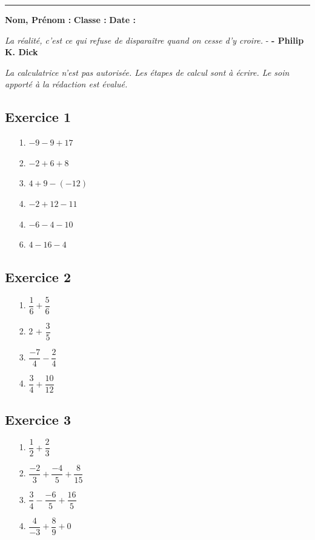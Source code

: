 \documentclass[12pt]{article}
\newcommand{\horrule}[1]{\rule{\linewidth}{#1}}
\begin{document}
\vspace{0.4cm}
\horrule{1px}
\vspace{0.4cm}

\textbf{Nom, Prénom :} \hspace{8cm} \textbf{Classe :} \hspace{3cm} \textbf{Date :}
\begin{center}
  \textit{La réalité, c'est ce qui refuse de disparaître quand on cesse d'y croire.}  - \textbf{ - Philip K. Dick}
\end{center}
\textit{La calculatrice n'est pas autorisée. Les étapes de calcul sont à écrire. Le soin apporté à la rédaction est évalué.}

\begin{multicols}{3}

\subsection*{Exercice 1} 

\begin{enumerate}
\item[1.] $-9 - 9 + 17 $
\item[2.] $-2 + 6 + 8  $
\item[3.] $4 + 9 -(-12)$
\item[4.] $-2 + 12 - 11$
\item[4.] $-6 - 4 - 10 $
\item[6.] $4 - 16 - 4  $
\end{enumerate}

\subsection*{Exercice 2}


\begin{enumerate}
\item[1.] $\dfrac{1}{6} + \dfrac{5}{6}$
\item[2.] 2 + $\dfrac{3}{5}$
\item[3.] $\dfrac{-7}{4} - \dfrac{2}{4}$
\item[4.] $\dfrac{3}{4} + \dfrac{10}{12}$
\end{enumerate}



\subsection*{Exercice 3}

\begin{enumerate}
\item[1.] $\dfrac{1}{2} + \dfrac{2}{3}$
\item[2.] $\dfrac{-2}{3} + \dfrac{-4}{5} + \dfrac{8}{15}$
\item[3.] $\dfrac{3}{4} - \dfrac{-6}{5} + \dfrac{16}{5}$
\item[4.] $\dfrac{4}{-3} + \dfrac{8}{9} + 0$
\end{enumerate}

\end{multicols}
\end{document}
